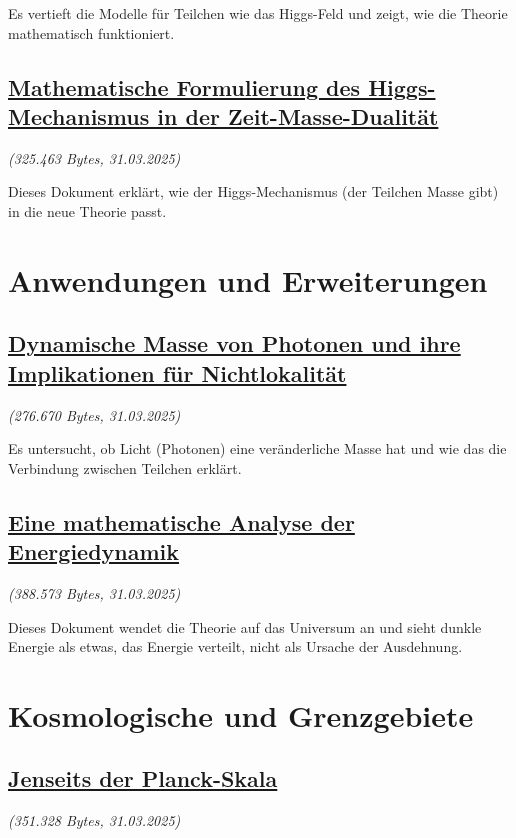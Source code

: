 \documentclass[a4paper,12pt]{article}
\newcommand{\repobase}{https://github.com/jpascher/T0-Time-Mass-Duality/tree/main/2/}
\begin{document}
	Es vertieft die Modelle für Teilchen wie das Higgs-Feld und zeigt, wie die Theorie mathematisch funktioniert.
	
	\subsection{\small\href{\repobase/pdf/Deutsch/Mathematische Formulierung des Higgs-Mechanismus in der Zeit-Masse-Dualität.pdf}{Mathematische Formulierung des Higgs-Mechanismus in der Zeit-Masse-Dualität}}
	\textit{(325.463 Bytes, 31.03.2025)}
	
	Dieses Dokument erklärt, wie der Higgs-Mechanismus (der Teilchen Masse gibt) in die neue Theorie passt.
	
	\section{Anwendungen und Erweiterungen}
	
	\subsection{\small\href{\repobase/pdf/Deutsch/Dynamische Masse von Photonen und ihre Implikationen für Nichtlokalität.pdf}{Dynamische Masse von Photonen und ihre Implikationen für Nichtlokalität}}
	\textit{(276.670 Bytes, 31.03.2025)}
	
	Es untersucht, ob Licht (Photonen) eine veränderliche Masse hat und wie das die Verbindung zwischen Teilchen erklärt.
	
	\subsection{\small\href{\repobase/pdf/Deutsch/Eine mathematische Analyse der Energiedynamik.pdf}{Eine mathematische Analyse der Energiedynamik}}
	\textit{(388.573 Bytes, 31.03.2025)}
	
	Dieses Dokument wendet die Theorie auf das Universum an und sieht dunkle Energie als etwas, das Energie verteilt, nicht als Ursache der Ausdehnung.
	
	\section{Kosmologische und Grenzgebiete}
	
	\subsection{\small\href{\repobase/pdf/Deutsch/Jenseits der Planck-Skala.pdf}{Jenseits der Planck-Skala}}
	\textit{(351.328 Bytes, 31.03.2025)}
	
\end{document}
